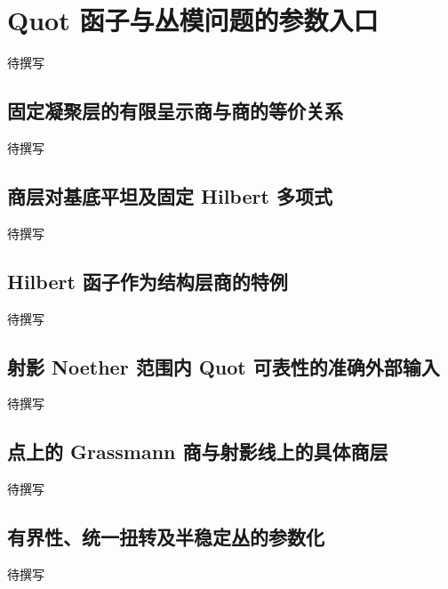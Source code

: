 
% 
% 
% 
% 

\section{Quot 函子与丛模问题的参数入口}
\label{g5:sec:3306}

待撰写

\subsection{固定凝聚层的有限呈示商与商的等价关系}
\label{g5:subsec:3306:01}
待撰写

\subsection{商层对基底平坦及固定 Hilbert 多项式}
\label{g5:subsec:3306:02}
待撰写

\subsection{Hilbert 函子作为结构层商的特例}
\label{g5:subsec:3306:03}
待撰写

\subsection{射影 Noether 范围内 Quot 可表性的准确外部输入}
\label{g5:subsec:3306:04}
待撰写

\subsection{点上的 Grassmann 商与射影线上的具体商层}
\label{g5:subsec:3306:05}
待撰写

\subsection{有界性、统一扭转及半稳定丛的参数化}
\label{g5:subsec:3306:06}
待撰写

